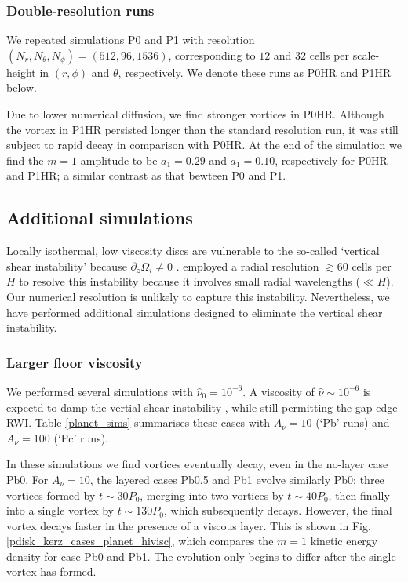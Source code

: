 \subsubsection{Double-resolution runs}%
We repeated simulations P0 and P1 with resolution
$(N_r,N_\theta,N_\phi)=(512,96,1536)$, corresponding
to $12$ and $32$ cells per scale-height in $(r,\phi)$ and $\theta$,
respectively. We denote these runs as P0HR and P1HR below. 

Due to lower numerical diffusion, we find stronger vortices in P0HR. 
Although the vortex in P1HR persisted longer than the standard
resolution run, it was still subject to rapid decay in comparison with
P0HR. At the end of the simulation we find the $m=1$ amplitude to be
$a_1=0.29$ and $a_1=0.10$, respectively for P0HR and P1HR; a similar
contrast as that bewteen P0 and P1.  


\subsection{Additional simulations}%
Locally isothermal, low viscosity discs are vulnerable to the
so-called `vertical shear 
instability' because $\partial_z\Omega_i\neq 0$ \citep{nelson12}. 
\citeauthor{nelson12} employed a radial  resolution $\gtrsim 60$ cells
per $H$ to resolve this instability because it involves small radial
wavelengths ($\ll H$). Our numerical resolution is unlikely to capture
this instability. Nevertheless, we have performed additional
simulations designed to eliminate the vertical shear instability.   

\subsubsection{Larger floor viscosity}
We performed several simulations with $\hat{\nu}_0=10^{-6}$. A viscosity of
$\hat{\nu}\sim 10^{-6}$ is expectd to damp the vertial shear 
instability \citep{nelson12}, while still permitting the gap-edge
RWI. Table \ref{planet_sims} summarises
these cases with $A_\nu=10$ (`Pb' runs) and $A_\nu=100$ (`Pc' runs). 

In these simulations we find vortices eventually decay, even in the
no-layer case Pb0. For $A_\nu=10$, the layered cases Pb0.5 and Pb1 evolve
similarly Pb0: three vortices formed by $t\sim30P_0$, merging into two
vortices by $t\sim40P_0$, then finally into a single vortex by
$t\sim130P_0$, which subsequently decays. However, the final vortex
decays faster in the presence of a viscous layer. This is shown in
Fig. \ref{pdisk_kerz_cases_planet_hivisc}, which compares the $m=1$
kinetic energy density for case Pb0 and Pb1. The evolution only begins
to differ after the single-vortex has formed. 

